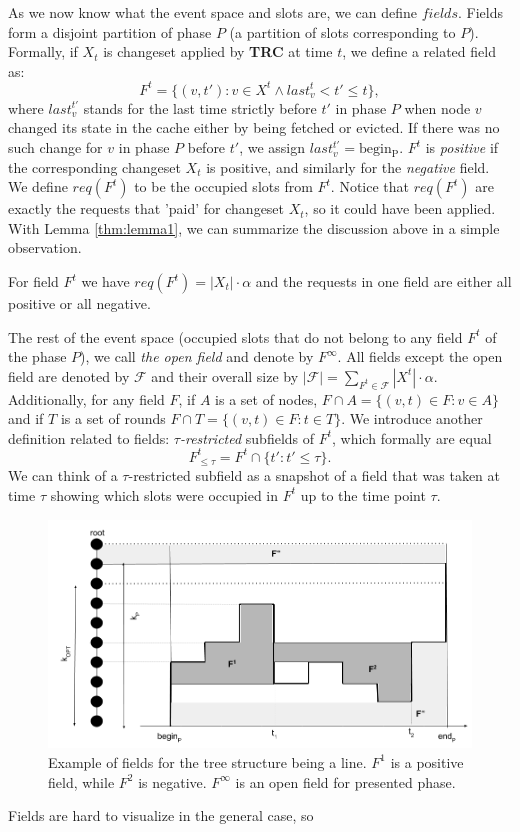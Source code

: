 As we now know what the event space and slots are, we can define $fields$.
Fields form a disjoint partition of phase $P$ (a partition of slots corresponding to
$P$). Formally, if $X_t$ is changeset applied by \textbf{TRC} at time $t$, we
define a related field as: $$F^t = \{(v, t'): v \in X^t \wedge last_v^t < t' \leq
t\},$$ where $last_v^{t'}$ stands for the last time strictly before $t'$ in
phase $P$ when node $v$ changed its state in the cache either by being fetched
or evicted. If there was no such change for $v$ in phase $P$ before $t'$, we
assign $last_v^{t'} = \mathrm{begin_P}$. $F^t$ is \textit{positive} if the
corresponding changeset $X_t$ is positive, and similarly for the \textit{negative}
field. We define $req(F^t)$ to be the occupied slots from $F^t$. Notice that
$req(F^t)$ are exactly the requests that 'paid' for changeset $X_t$, so it could
have been applied. With Lemma \ref{thm:lemma1}, we can summarize the discussion
above in a simple observation.  \begin{observe} For field $F^t$ we have
$req(F^t) = |X_t| \cdot \alpha$ and the requests in one field are either all
positive or all negative.  \label{obs:observe1} \end{observe} The rest of the
event space (occupied slots that do not belong to any field $F^t$ of the phase
$P$), we call \textit{the open field} and denote by $F^{\infty}$. All fields
except the open field are denoted by $\mathcal{F}$ and their overall size by
$|\mathcal{F}| = \sum_{F^t \in \mathcal{F}} |X^t| \cdot \alpha$.  Additionally,
for any field $F$, if $A$ is a set of nodes, $F \cap A = \{(v,t) \in F: v \in
A\}$ and if $T$ is a set of rounds $F \cap T = \{(v, t) \in F: t \in T\}$. We
introduce another definition related to fields: $\tau$\textit{-restricted}
subfields of $F^t$, which formally are equal $$F^t_{\leq \tau} = F^t \cap \{t':
t' \leq \tau\}.$$ We can think of a $\tau$-restricted subfield as a snapshot of
a field that was taken at time $\tau$ showing which slots were occupied in $F^t$
up to the time point $\tau$.  \begin{figure} \begin{center}
\includegraphics[width=1.1\textwidth]{fields.png} \end{center} \caption{Example
of fields for the tree structure being a line. $F^1$ is a positive field, while $F^2$
is negative. $F^{\infty}$ is an open field for presented phase.}
\label{fig:fields} \end{figure} Fields are hard to visualize in the general case, so
